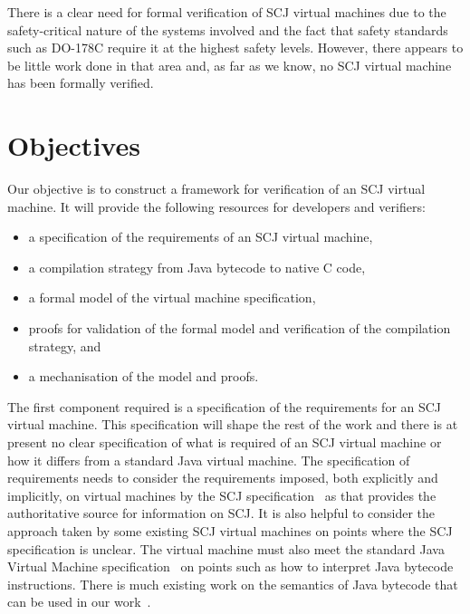 \documentclass[a4paper,10pt]{report}
\begin{document}
There is a clear need for formal verification of SCJ virtual machines
due to the safety-critical nature of the systems involved and the fact
that safety standards such as DO-178C require it at the highest safety
levels.
However, there appears to be little work done in that area and, as far
as we know, no SCJ virtual machine has been formally verified.


\section{Objectives}

Our objective is to construct a framework for verification of an SCJ
virtual machine.
It will provide the following resources for developers and verifiers:
\begin{itemize}
\item a specification of the requirements of an SCJ virtual machine,
\item a compilation strategy from Java bytecode to native C code,
\item a formal model of the virtual machine specification,
\item proofs for validation of the formal model and verification of
  the compilation strategy, and
\item a mechanisation of the model and proofs.
\end{itemize}

The first component required is a specification of the requirements
for an SCJ virtual machine.
This specification will shape the rest of the work and there is at
present no clear specification of what is required of an SCJ virtual
machine or how it differs from a standard Java virtual machine.
The specification of requirements needs to consider the requirements
imposed, both explicitly and implicitly, on virtual machines by the
SCJ specification~\cite{locke2013} as that provides the authoritative
source for information on SCJ.
It is also helpful to consider the approach taken by some existing SCJ
virtual machines on points where the SCJ specification is unclear.
The virtual machine must also meet the standard Java Virtual Machine
specification~\cite{lindholm2014} on points such as how to interpret
Java bytecode instructions.
There is much existing work on the semantics of Java bytecode that can
be used in our work~\cite{bertelsen2000, jones1998, stark2001}.
\end{document}
